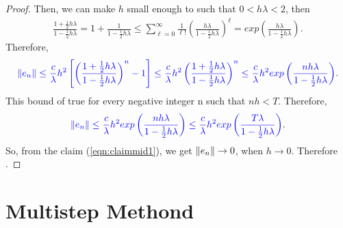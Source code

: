 \documentclass[12pt]  {article}%
\begin{document}
\begin{proof}
Then, we can make $h$ small enough to such that $0<h\lambda<2$, then
\begin{eqnarray*}
\frac{1+\frac{1}{2}h\lambda}{1-\frac{1}{2}h\lambda}=1+\frac{1}{1-\frac{1}{2}h\lambda}\leq \sum_{\ell=0}^{\infty}\frac{1}{\ell!}\left(\frac{h\lambda}{1-\frac{1}{2}h\lambda}\right)^\ell=exp\left(\frac{h\lambda}{1-\frac{1}{2}h\lambda}\right).
\end{eqnarray*}
Therefore,
 \begin{eqnarray}
 \textcolor{blue}{\left\|e_n\right\| \leq \frac{c}{\lambda}h^2\left[\left(\frac{1+\frac{1}{2}h\lambda}{1-\frac{1}{2}h\lambda}\right)^n-1\right]\leq \frac{c}{\lambda}h^2\left(\frac{1+\frac{1}{2}h\lambda}{1-\frac{1}{2}h\lambda}\right)^n\leq \frac{c}{\lambda}h^2exp\left(\frac{nh\lambda}{1-\frac{1}{2}h\lambda}\right)}.
\end{eqnarray}
This bound of true for every negative integer n such that $nh<T$.
Therefore,
 \begin{eqnarray}\label{eqn:claimmid1}
 \textcolor{blue}{\left\|e_n\right\| \leq \frac{c}{\lambda}h^2exp\left(\frac{nh\lambda}{1-\frac{1}{2}h\lambda}\right) \leq\frac{c}{\lambda}h^2exp\left(\frac{T\lambda}{1-\frac{1}{2}h\lambda}\right)}.
\end{eqnarray}
So, from the claim (\ref{eqn:claimmid1}), we get $\left\|e_n\right\|\to 0$, when $h\to 0$. Therefore
.
\end{proof}

\section{Multistep Methond}
\end{document}
